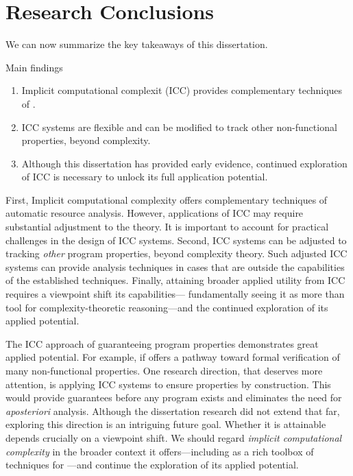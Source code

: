 \section{Research Conclusions}
\label{ssec:findings}

We can now summarize the key takeaways of this dissertation.

\begin{infobox}{Main findings}
\begin{enumerate}[wide, labelwidth=!, labelindent=0pt]

\item Implicit computational complexit (ICC) provides complementary
techniques of .

\item ICC systems are flexible and can be modified to track other
non-functional properties, beyond complexity. 

\item Although this dissertation has provided early evidence, continued
exploration of ICC is necessary to unlock its full application potential.

\end{enumerate}
\end{infobox}

First, Implicit computational complexity offers complementary techniques of
automatic resource analysis. However, applications of ICC may require
substantial adjustment to the theory. It is important to account for practical
challenges in the design of ICC systems. Second, ICC systems can be adjusted to
tracking \emph{other} program properties, beyond complexity theory. Such
adjusted ICC systems can provide analysis techniques in cases that are outside
the capabilities of the established techniques. Finally, attaining broader
applied utility from ICC requires a viewpoint shift \wrt its capabilities---\ie
fundamentally seeing it as more than tool for complexity-theoretic
reasoning---and the continued exploration of its applied potential.

The ICC approach of guaranteeing program properties demonstrates great applied
potential. For example, if offers a pathway toward formal verification of many
non-functional properties. One research
direction, that deserves more attention, is applying ICC systems to ensure
properties by construction. This would provide guarantees before any program
exists and eliminates the need for \emph{aposteriori} analysis. Although the
dissertation research did not extend that far, exploring this direction is an
intriguing future goal. Whether it is attainable depends crucially on a
viewpoint shift. We should regard \emph{implicit computational complexity} in
the broader context it offers---including as a rich toolbox of techniques for
---and continue the exploration of its applied
potential.

